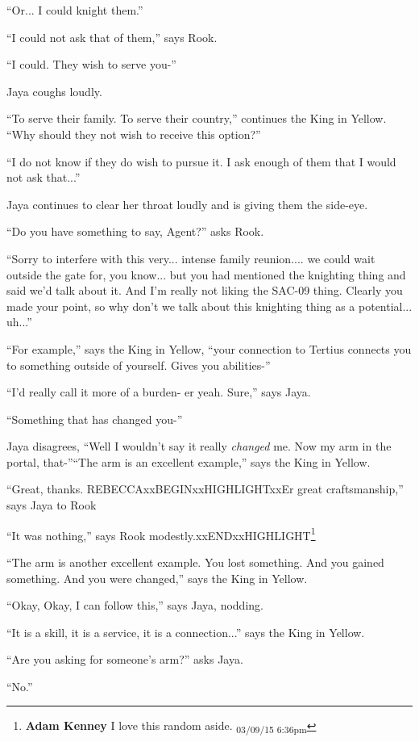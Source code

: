 ``Or... I could knight them.''

``I could not ask that of them,'' says Rook.

``I could.  They wish to serve you-''

Jaya coughs loudly.

``To serve their family.  To serve their country,'' continues the King in Yellow.  ``Why should they not wish to receive this option?''

``I do not know if they do wish to pursue it.  I ask enough of them that I would not ask that...''

Jaya continues to clear her throat loudly and is giving them the side-eye.

``Do you have something to say, Agent?'' asks Rook.

``Sorry to interfere with this very... intense family reunion.... we could wait outside the gate for, you know... but you had mentioned the knighting thing and said we'd talk about it.  And I'm really not liking the SAC-09 thing.  Clearly you made your point, so why don't we talk about this knighting thing as a potential... uh...''

``For example,'' says the King in Yellow, ``your connection to Tertius connects you to something outside of yourself. Gives you abilities-''

``I'd really call it more of a burden- er yeah. Sure,'' says Jaya.

``Something that has changed you-''

Jaya disagrees, ``Well I wouldn't say it really \textit{changed} me.  Now my arm in the portal, that-''``The arm is an excellent example,'' says the King in Yellow.

``Great, thanks.  REBECCAxxBEGINxxHIGHLIGHTxxEr great craftsmanship,'' says Jaya to Rook

``It was nothing,'' says Rook modestly.xxENDxxHIGHLIGHT\footnote{\textbf{Adam Kenney }I love this random aside. \textsubscript{03/09/15 6:36pm}}

``The arm is another excellent example.  You lost something.  And you gained something.  And you were changed,'' says the King in Yellow.

``Okay, Okay, I can follow this,'' says Jaya, nodding.

``It is a skill, it is a service, it is a connection...'' says the King in Yellow.

``Are you asking for someone's arm?'' asks Jaya.

``No.''

